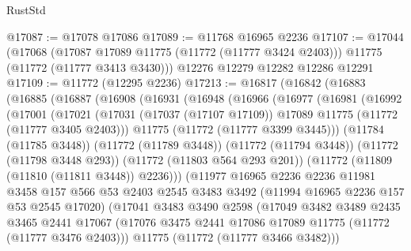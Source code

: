 \begin{lexlean}{RustStd}
\begin{coremodule}
@17087 := @17078 @17086
@17089 := @11768 @16965 @2236
@17107 := @17044
    (@17068
      (@17087 @17089 @11775 (@11772 (@11777 @3424 @2403)))
      @11775
      (@11772 (@11777 @3413 @3430)))
    @12276
    @12279
    @12282
    @12286
    @12291
@17109 := @11772 (@12295 @2236)
@17213 := @16817
    (@16842
      (@16883
        (@16885
          (@16887
            (@16908
              (@16931
                (@16948
                  (@16966
                    (@16977
                      (@16981
                        (@16992
                          (@17001
                            (@17021
                              (@17031
                                (@17037 (@17107 @17109))
                                @17089
                                @11775
                                (@11772 (@11777 @3405 @2403)))
                              @11775
                              (@11772 (@11777 @3399 @3445)))
                            (@11784 (@11785 @3448))
                            (@11772 (@11789 @3448))
                            (@11772 (@11794 @3448))
                            (@11772 (@11798 @3448 @293))
                            (@11772 (@11803 @564 @293 @201))
                            (@11772 (@11809 (@11810 (@11811 @3448)) @2236)))
                          (@11977
                            @16965
                            @2236
                            @2236
                            @11981
                            @3458
                            @157
                            @566
                            @53
                            @2403
                            @2545
                            @3483
                            @3492
                            (@11994 @16965 @2236 @157 @53 @2545 @17020)
                            (@17041
                              @3483
                              @3490
                              @2598
                              (@17049
                                @3482
                                @3489
                                @2435
                                @3465
                                @2441
                                @17067
                                (@17076
                                  @3475
                                  @2441
                                  @17086
                                  @17089
                                  @11775
                                  (@11772 (@11777 @3476 @2403)))
                                @11775
                                (@11772 (@11777 @3466 @3482)))

\end{coremodule}
\end{lexlean}

